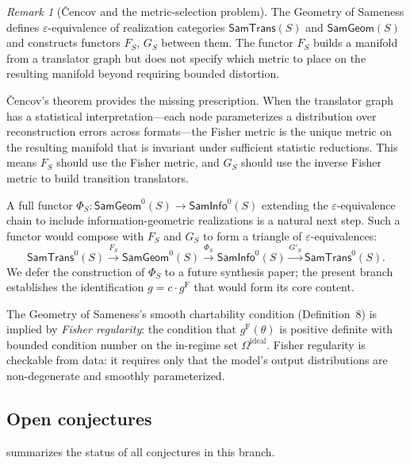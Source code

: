 \documentclass[11pt]{article}
\newcommand{\gF}{g^{\mathrm{F}}}
\newcommand{\SamTrans}{\mathsf{SamTrans}}
\newcommand{\SamGeom}{\mathsf{SamGeom}}
\newcommand{\SamInfo}{\mathsf{SamInfo}}
\theoremstyle{remark}
\newtheorem{remark}{Remark}
\begin{document}
\begin{remark}[\v{C}encov and the metric-selection problem]
\label{rmk:cencov-sameness}
The Geometry of Sameness defines $\varepsilon$-equivalence of realization
categories $\SamTrans(S)$ and $\SamGeom(S)$ and constructs functors $F_S$,
$G_S$ between them.  The functor $F_S$ builds a manifold from a translator
graph but does not specify which metric to place on the resulting manifold
beyond requiring bounded distortion.

\v{C}encov's theorem provides the missing prescription.  When the translator
graph has a statistical interpretation---each node parameterizes a
distribution over reconstruction errors across formats---the Fisher metric is
the unique metric on the resulting manifold that is invariant under sufficient
statistic reductions.  This means $F_S$ should use the Fisher metric, and
$G_S$ should use the inverse Fisher metric to build transition translators.

A full functor $\Phi_S : \SamGeom^0(S) \to \SamInfo^0(S)$ extending the
$\varepsilon$-equivalence chain to include information-geometric realizations
is a natural next step.  Such a functor would compose with $F_S$ and $G_S$
to form a triangle of $\varepsilon$-equivalences:
\[
\SamTrans^0(S) \xrightarrow{F_S} \SamGeom^0(S) \xrightarrow{\Phi_S}
\SamInfo^0(S) \xrightarrow{G'_S} \SamTrans^0(S).
\]
We defer the construction of $\Phi_S$ to a future synthesis paper; the
present branch establishes the identification $g = c \cdot \gF$ that would
form its core content.
\end{remark}

The Geometry of Sameness's smooth chartability condition (Definition~8) is
implied by \emph{Fisher regularity}: the condition that
$\gF(\theta)$ is positive definite with bounded condition number on the
in-regime set $\Omega^{\mathrm{ideal}}$.  Fisher regularity is checkable
from data: it requires only that the model's output distributions are
non-degenerate and smoothly parameterized.

\subsection{Open conjectures}

 summarizes the status of all conjectures in this branch.
\end{document}
